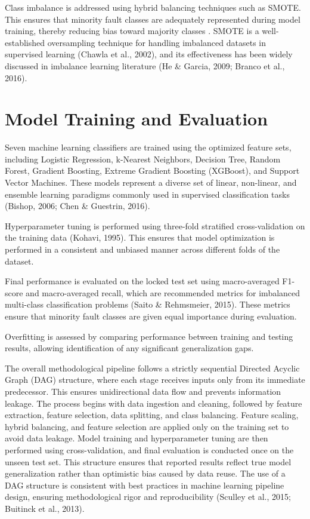 Class imbalance is addressed using hybrid balancing techniques such as SMOTE. This ensures that minority fault classes are adequately represented during model training, thereby reducing bias toward majority classes \parencite{Azmi2025Imbalance}. SMOTE is a well-established oversampling technique for handling imbalanced datasets in supervised learning (Chawla et al., 2002), and its effectiveness has been widely discussed in imbalance learning literature (He & Garcia, 2009; Branco et al., 2016).

\section{Model Training and Evaluation}

Seven machine learning classifiers are trained using the optimized feature sets, including Logistic Regression, k-Nearest Neighbors, Decision Tree, Random Forest, Gradient Boosting, Extreme Gradient Boosting (XGBoost), and Support Vector Machines. These models represent a diverse set of linear, non-linear, and ensemble learning paradigms commonly used in supervised classification tasks (Bishop, 2006; Chen & Guestrin, 2016).

Hyperparameter tuning is performed using three-fold stratified cross-validation on the training data (Kohavi, 1995). This ensures that model optimization is performed in a consistent and unbiased manner across different folds of the dataset.

Final performance is evaluated on the locked test set using macro-averaged F1-score and macro-averaged recall, which are recommended metrics for imbalanced multi-class classification problems (Saito & Rehmsmeier, 2015). These metrics ensure that minority fault classes are given equal importance during evaluation.

Overfitting is assessed by comparing performance between training and testing results, allowing identification of any significant generalization gaps.

The overall methodological pipeline follows a strictly sequential Directed Acyclic Graph (DAG) structure, where each stage receives inputs only from its immediate predecessor. This ensures unidirectional data flow and prevents information leakage. The process begins with data ingestion and cleaning, followed by feature extraction, feature selection, data splitting, and class balancing. Feature scaling, hybrid balancing, and feature selection are applied only on the training set to avoid data leakage. Model training and hyperparameter tuning are then performed using cross-validation, and final evaluation is conducted once on the unseen test set. This structure ensures that reported results reflect true model generalization rather than optimistic bias caused by data reuse. The use of a DAG structure is consistent with best practices in machine learning pipeline design, ensuring methodological rigor and reproducibility (Sculley et al., 2015; Buitinck et al., 2013).